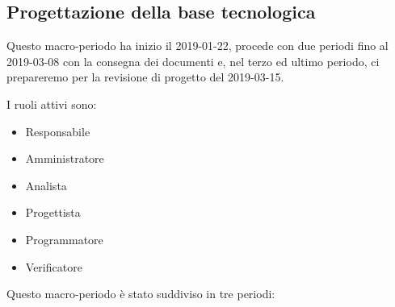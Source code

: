 		\newpage

        \subsection{Progettazione della base tecnologica}
		Questo macro-periodo ha inizio il 2019-01-22, procede con due periodi fino al 2019-03-08 con la consegna
		dei documenti e, nel terzo ed ultimo periodo, ci prepareremo per la revisione di progetto del 2019-03-15.

        I ruoli attivi sono:
        \begin{itemize}
            \item Responsabile
            \item Amministratore
            \item Analista
            \item Progettista
            \item Programmatore
            \item Verificatore
        \end{itemize}
        Questo macro-periodo è stato suddiviso in tre periodi:
